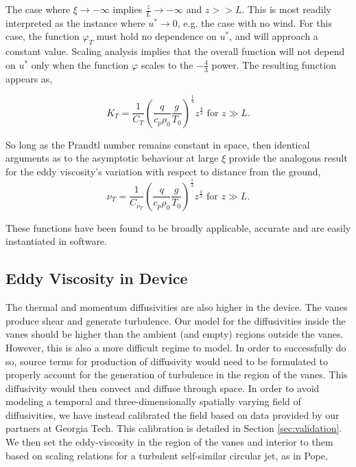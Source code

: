 The case where $\xi \to -\infty $ implies $\frac{z}{L} \to
-\infty $ and $z>>L$. This is most readily interpreted as the instance
where $u^* \to 0$, e.g. the case with no wind. For this case, the
function $\varphi_T$ must hold no dependence on $u^*$, and will approach
a constant value. Scaling analysis implies that the overall function
will not depend on $u^*$ only when the function $\varphi$ scales to the
$-\frac{4}{3}$ power. The resulting function appears as, 

\begin{equation}
 K_T = \frac{1}{C_T} \left( \frac{q}{c_p \rho_0} \frac{g}{T_0}
		     \right)^\frac{1}{3} z^{\frac{4}{3}}  \text{ 
for } z \gg L. 
\end{equation}

So long as the Prandtl number remains constant in space\cite{}, then
identical arguments as to the asymptotic behaviour at large $\xi$ provide
the analogous result for the eddy viscosity's variation with respect to
distance from the ground,  
\begin{equation}
 \nu_T = \frac{1}{C_{\nu_T}} \left( \frac{q}{c_p \rho_0} \frac{g}{T_0}
			     \right)^\frac{1}{3} z^{\frac{4}{3}}  \text{ 
for } z \gg L. 
\end{equation}

These functions have been found to be broadly applicable, accurate and 
are easily instantiated in software. 

\subsection{Eddy Viscosity in Device}

The thermal and momentum diffusivities are also higher in the
device. The vanes produce shear and generate turbulence. Our model for 
the diffusivities inside the vanes should be higher than the ambient
(and empty) regions outside the vanes. However, this is also a more
difficult regime to model. In order to successfully do so, source terms
for production of diffusivity would need to be formulated to properly
account for the generation of turbulence in the region of the
vanes. This diffusivity would then convect and diffuse through space. In
order to avoid modeling a temporal and three-dimensionally spatially
varying field of diffusivities, we have instead calibrated the field
based on data provided by our partners at Georgia Tech. This calibration
is detailed in Section \ref{sec:validation}. We then set the eddy-viscosity in
the region of the vanes and interior to them based on scaling relations
for a turbulent self-similar circular jet, as in
Pope\cite{pope2000turbulent},
 
